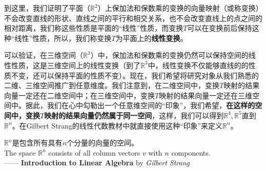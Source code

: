 到这里，我们证明了平面（$\mathbb{R}^2$）上保加法和保数乘的变换的向量映射（或称变换）不会改变直线的形状、直线之间的平行和相交关系，也不会改变直线上的点之间的相对距离，我们称这些性质是平面的“线性”性质，而变换$T$可以在变换前后保持这种“线性”性质，所以，我们称变换$T$为平面上的\textcolor{third}{\bf 线性变换}。

可以验证，在三维空间（$\mathbb{R}^3$）中，保加法和保数乘的变换仍然可以保持空间的线性性质，这是三维空间上的线性变换（到了$\mathbb{R}^3$中，线性变换不仅能够直线的的性质不变，还可以保持平面的性质不变）。现在，我们希望将研究对象从我们熟悉的二维、三维空间推广到任意维度。我们注意到，在二维空间中，变换$T$映射的结果向量一定还在二维空间中；在三维空间中，变换$T$映射的结果向量一定还在三维空间中。据此，我们在心中勾勒出一个任意维空间的“印象”，我们希望，\textbf{在这样的空间中，变换$T$映射的结果向量仍然属于同一空间}，这样，我们可以得到$\mathbb{R}^4, \mathbb{R}^5$直到$\mathbb{R}^n$。在Gilbert Strang的线性代数教材中就直接使用这种“印象”来定义$\mathbb{R}^n$。

\begin{definition}[$\mathbb{R}^n$]
    $\mathbb{R}^n$是包含所有具有$n$个分量的向量的空间。\\
    The space $\mathbb{R}^n$ consists of all column vectors $v$ with $n$ components.\\
    —— \textbf{Introduction to Linear Algebra} by \textit{Gilbert Strang}
\end{definition}

